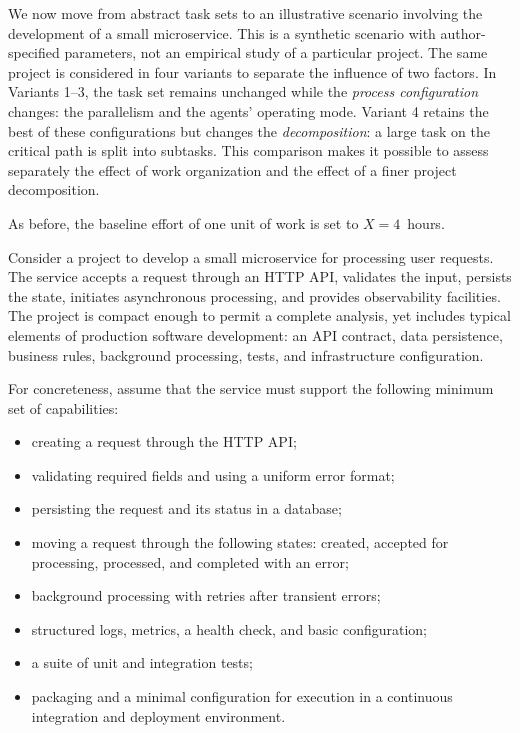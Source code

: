 
We now move from abstract task sets to an illustrative scenario involving the
development of a small microservice. This is a synthetic scenario with
author-specified parameters, not an empirical study of a particular project.
The same project is considered in four variants to separate the influence of
two factors. In Variants 1--3, the task set remains unchanged while the
\emph{process configuration} changes: the parallelism and the agents' operating
mode. Variant 4 retains the best of these configurations but changes the
\emph{decomposition}: a large task on the critical path is split into subtasks.
This comparison makes it possible to assess separately the effect of work
organization and the effect of a finer project decomposition.

As before, the baseline effort of one unit of work is set to $X = 4$~hours.


Consider a project to develop a small microservice for processing user
requests. The service accepts a request through an HTTP API, validates the
input, persists the state, initiates asynchronous processing, and provides
observability facilities. The project is compact enough to permit a complete
analysis, yet includes typical elements of production software development: an
API contract, data persistence, business rules, background processing, tests,
and infrastructure configuration.

For concreteness, assume that the service must support the following minimum
set of capabilities:
\begin{itemize}
  \item creating a request through the HTTP API;
  \item validating required fields and using a uniform error format;
  \item persisting the request and its status in a database;
  \item moving a request through the following states: created, accepted for
  processing, processed, and completed with an error;
  \item background processing with retries after transient errors;
  \item structured logs, metrics, a health check, and basic configuration;
  \item a suite of unit and integration tests;
  \item packaging and a minimal configuration for execution in a continuous
  integration and deployment environment.
\end{itemize}

